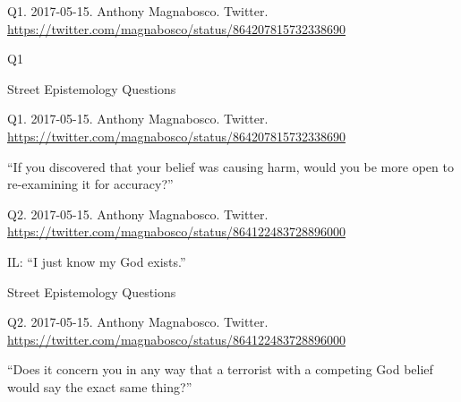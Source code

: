 \documentclass[
    src/templates/5x2-on-a4paper,
    frame
]{flashcards}
\newcommand{\myheader}{}
\newcommand{\myfooter}{
    \begin{flushright}
        \small\sc
        Street Epistemology Questions \par
    \end{flushright}
}
\begin{document}
        \renewcommand{\myheader}{
            \normalfont %
            \begin{tiny}
                Q1.
                2017-05-15.
                Anthony Magnabosco.
                    Twitter.
                    \\
                    \url{ https://twitter.com/magnabosco/status/864207815732338690 }
                \par
            \end{tiny}
        }
        \begin{flashcard}{
            \myheader
            \vspace{\fill}
            \begin{center}
                \large
                    Q1
            \end{center}
            \vspace{\fill}
            \myfooter
            \vspace{-1.4ex}
        }
            \myheader
            \vspace{\fill}
            \begin{center}
                \large
\enquote{If you discovered that your belief was causing harm, would you be more open to re-examining it for accuracy?}            \end{center}
            \vspace{\fill}
        \end{flashcard}
        \renewcommand{\myheader}{
            \normalfont %
            \begin{tiny}
                Q2.
                2017-05-15.
                Anthony Magnabosco.
                    Twitter.
                    \\
                    \url{ https://twitter.com/magnabosco/status/864122483728896000 }
                \par
            \end{tiny}
        }
        \begin{flashcard}{
            \myheader
            \vspace{\fill}
            \begin{center}
                \large
                    IL: \enquote{I just know my God exists.}            \end{center}
            \vspace{\fill}
            \myfooter
            \vspace{-1.4ex}
        }
            \myheader
            \vspace{\fill}
            \begin{center}
                \large
\enquote{Does it concern you in any way that a terrorist with a competing God belief would say the exact same thing?}            \end{center}
            \vspace{\fill}
        \end{flashcard}
\end{document}
